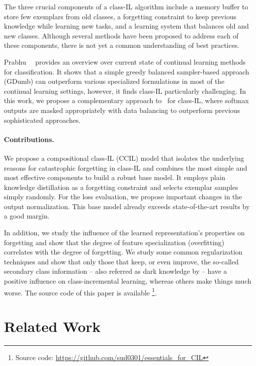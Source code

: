 \documentclass[final]{cvpr}
\begin{document}
The three crucial components of a class-IL algorithm include a memory buffer to store few exemplars from old classes, a forgetting constraint to keep previous knowledge while learning new tasks, and a learning system that balances old and new classes. 
Although several methods have been proposed to address each of these components, there is not yet a common understanding of best practices.

Prabhu~\etal~\cite{gdumb} provides an overview over current state of continual learning methods for classification. It shows that a simple greedy balanced sampler-based approach (GDumb) can outperform various specialized formulations in most of the continual learning settings, however, it finds class-IL particularly challenging. In this work, we propose a complementary approach to~\cite{gdumb} for class-IL, where softmax outputs are masked appropriately with data balancing to outperform previous sophisticated approaches.

\paragraph{Contributions.} We propose a compositional class-IL (CCIL) model that isolates the underlying reasons for catastrophic forgetting in class-IL and combines the most simple and most effective components to build a robust base model.
It employs plain knowledge distillation \cite{kd} as a forgetting constraint and selects exemplar samples simply randomly. 
For the loss evaluation, we propose important changes in the output normalization. 
This base model already exceeds state-of-the-art results by a good margin.

In addition, we study the influence of the learned representation's properties on forgetting and show that the degree of feature specialization (overfitting) correlates with the degree of forgetting. We study some common regularization techniques and show that only those that keep, or even improve, the so-called secondary class information -- also referred as dark knowledge by \cite{kd} -- have a positive influence on class-incremental learning, whereas others make things much worse. The source code of this paper is available \footnote{Source code: \url{https://github.com/sud0301/essentials_for_CIL}}.
 \section{Related Work}
\label{sec:related_work}
\end{document}
